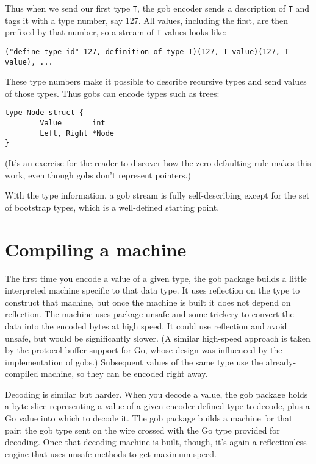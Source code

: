 Thus when we send our first type \texttt{T}, the gob encoder sends a
description of \texttt{T} and tags it with a type number, say 127. All
values, including the first, are then prefixed by that number, so a
stream of \texttt{T} values looks like:

\begin{Verbatim}[frame=single]
("define type id" 127, definition of type T)(127, T value)(127, T value), ...
\end{Verbatim}

These type numbers make it possible to describe recursive types and send
values of those types. Thus gobs can encode types such as trees:

\begin{Verbatim}[frame=single]
type Node struct {
        Value       int
        Left, Right *Node
}
\end{Verbatim}

(It's an exercise for the reader to discover how the zero-defaulting
rule makes this work, even though gobs don't represent pointers.)

With the type information, a gob stream is fully self-describing except
for the set of bootstrap types, which is a well-defined starting point.

\section*{Compiling a machine}

The first time you encode a value of a given type, the gob package
builds a little interpreted machine specific to that data type. It uses
reflection on the type to construct that machine, but once the machine
is built it does not depend on reflection. The machine uses package
unsafe and some trickery to convert the data into the encoded bytes at
high speed. It could use reflection and avoid unsafe, but would be
significantly slower. (A similar high-speed approach is taken by the
protocol buffer support for Go, whose design was influenced by the
implementation of gobs.) Subsequent values of the same type use the
already-compiled machine, so they can be encoded right away.

Decoding is similar but harder. When you decode a value, the gob package
holds a byte slice representing a value of a given encoder-defined type
to decode, plus a Go value into which to decode it. The gob package
builds a machine for that pair: the gob type sent on the wire crossed
with the Go type provided for decoding. Once that decoding machine is
built, though, it's again a reflectionless engine that uses unsafe
methods to get maximum speed.

